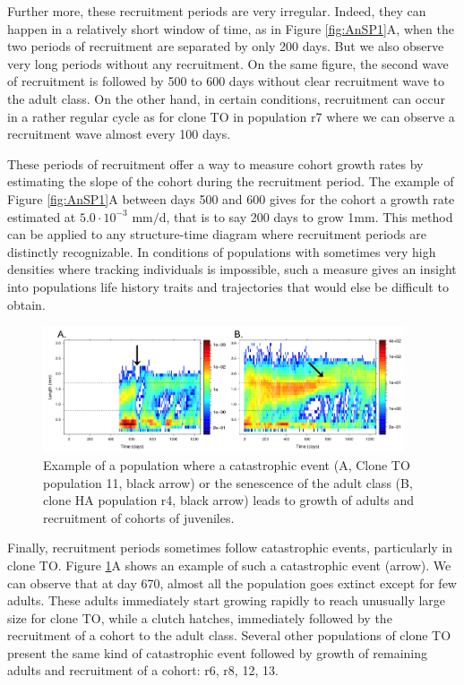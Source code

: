 Further more, these recruitment periods are very irregular. Indeed, they can
happen in a relatively short window of time, as in Figure \ref{fig:AnSP1}A, when the two
periods of recruitment are separated by only 200 days. But we also observe very
long periods without any recruitment. On the same figure, the second wave of
recruitment is followed by 500 to 600 days without clear recruitment wave to the
adult class. On the other hand, in certain conditions, recruitment can occur in
a rather regular cycle as for clone TO in population r7 where we can observe a
recruitment wave almost every 100 days.

These periods of recruitment offer a way to measure cohort growth rates by
estimating the slope of the cohort during the recruitment period. The example of
Figure \ref{fig:AnSP1}A between days 500 and 600 gives for the cohort a growth rate estimated
at $5.0\cdot 10^{-3}$ mm$/$d, that is to say 200 days to grow 1mm. This method
can be applied to any structure-time diagram where recruitment periods are distinctly
recognizable. In conditions of populations with sometimes very high densities
where tracking individuals is impossible, such a measure gives an insight into
populations life history traits and trajectories that would else be difficult to
obtain.

\begin{figure}[!ht]
\begin{center}
\includegraphics[width=0.95\textwidth]{3-1_ChapExp1/Fig/AnnSP2}
\caption[Examples of a population's
structure]{Example of a population where a catastrophic event (A, Clone TO
population 11, black arrow) or the senescence of the adult class (B, clone HA
population r4, black arrow) leads to growth of adults and recruitment of cohorts
of juveniles.}
\label{fig:AnSP2}
\end{center}
\end{figure}

Finally, recruitment periods sometimes follow catastrophic events, particularly
in clone TO. Figure \ref{fig:AnSP2}A shows an example of such a catastrophic
event (arrow).
We can observe that at day 670, almost all the population goes extinct except for
few adults. These adults immediately start growing rapidly to reach unusually
large size for clone TO, while a clutch hatches, immediately followed by the
recruitment of a cohort to the adult class. Several other populations of clone
TO present the same kind of catastrophic event followed by growth of remaining
adults and recruitment of a cohort: r6, r8, 12, 13.

